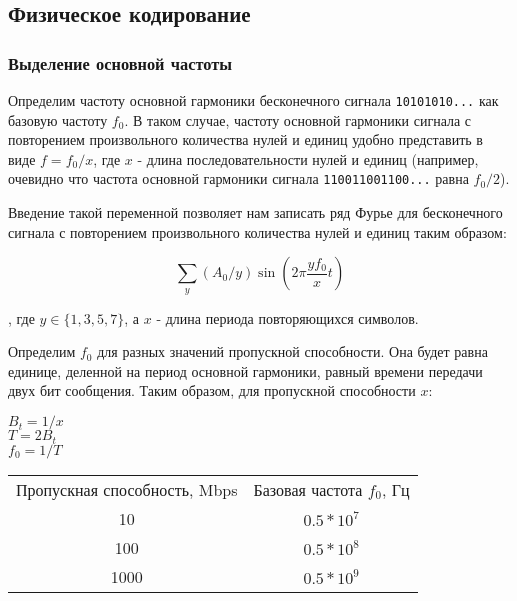 \documentclass[12pt, a4paper]{article}
\begin{document}
\subsection*{Физическое кодирование}

\subsubsection*{Выделение основной частоты}

Определим частоту основной гармоники бесконечного сигнала \texttt{10101010...}
как базовую частоту $f_0$. В таком случае, частоту основной гармоники сигнала
с повторением произвольного количества нулей и единиц удобно представить в
виде $f = f_0 / x$, где $x$ - длина последовательности нулей и единиц (например,
очевидно что частота основной гармоники сигнала \texttt{110011001100...} равна
$f_0 / 2$).

Введение такой переменной позволяет нам записать ряд Фурье для бесконечного
сигнала с повторением произвольного количества нулей и единиц таким образом:

$$\sum_y (A_0 / y) \sin (2 \pi \frac{y f_0}{x} t)$$

, где $y \in \{ 1, 3, 5, 7 \}$, а $x$ - длина периода повторяющихся символов.

Определим $f_0$ для разных значений пропускной способности. Она будет равна
единице, деленной на период основной гармоники, равный времени передачи двух
бит сообщения. Таким образом, для пропускной способности $x$:

\newpage

\noindent $B_t = 1 / x$ \\
$T = 2 B_t$ \\
$f_0 = 1 / T$ \\

\begin{tabular}{ c | c }
  Пропускная способность, Mbps & Базовая частота $f_0$, Гц \\
  10 & $0.5 * 10^7$ \\
  100 & $0.5 * 10^8$ \\
  1000 & $0.5 * 10^9$
\end{tabular}
\end{document}
